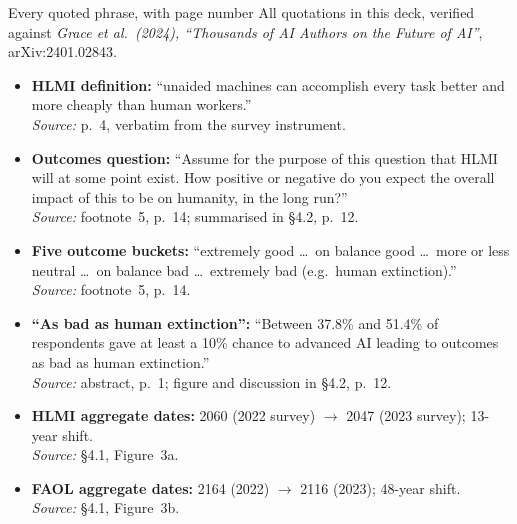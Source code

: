 \documentclass[aspectratio=169, 12pt, xcolor={dvipsnames,table}]{beamer}
\begin{document}
\begin{frame}[allowframebreaks]{Every quoted phrase, with page number}
  \footnotesize
  All quotations in this deck, verified against \emph{Grace et al.~(2024), ``Thousands of AI Authors on the Future of AI''}, arXiv:2401.02843.\\[0.8em]

  \begin{itemize}\setlength\itemsep{0.5em}
    \item \textbf{HLMI definition:} ``unaided machines can accomplish every task better and more cheaply than human workers.''\\
      \emph{Source:} p.~4, verbatim from the survey instrument.

    \item \textbf{Outcomes question:} ``Assume for the purpose of this question that HLMI will at some point exist. How positive or negative do you expect the overall impact of this to be on humanity, in the long run?''\\
      \emph{Source:} footnote~5, p.~14; summarised in \S4.2, p.~12.

    \item \textbf{Five outcome buckets:} ``extremely good \dots\ on balance good \dots\ more or less neutral \dots\ on balance bad \dots\ extremely bad (e.g.\ human extinction).''\\
      \emph{Source:} footnote~5, p.~14.

    \item \textbf{``As bad as human extinction'':} ``Between 37.8\% and 51.4\% of respondents gave at least a 10\% chance to advanced AI leading to outcomes as bad as human extinction.''\\
      \emph{Source:} abstract, p.~1; figure and discussion in \S4.2, p.~12.

    \item \textbf{HLMI aggregate dates:} 2060 (2022 survey) $\to$ 2047 (2023 survey); 13-year shift.\\
      \emph{Source:} \S4.1, Figure~3a.

    \item \textbf{FAOL aggregate dates:} 2164 (2022) $\to$ 2116 (2023); 48-year shift.\\
      \emph{Source:} \S4.1, Figure~3b.
  \end{itemize}
\end{frame}
\end{document}
